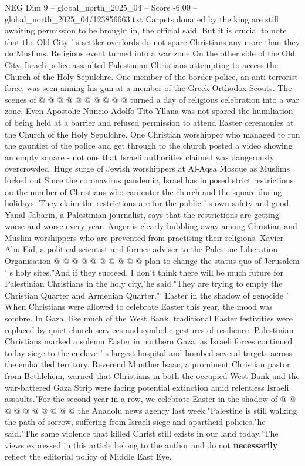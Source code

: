 \begin{textsample}{NEG Dim 9 – global\_north\_2025\_04 – Score -6.00 – global\_north\_2025\_04/123856663.txt}
Carpets donated by the king are still awaiting permission to be brought in, the official said.
But it is crucial to note that the Old City ' s settler overlords do not spare Christians any more than they do Muslims.
Religious event turned into a war zone On the other side of the Old City, Israeli police assaulted Palestinian Christians attempting to access the Church of the Holy Sepulchre.
One member of the border police, an anti-terrorist force, was seen aiming his gun at a member of the Greek Orthodox Scouts.
The scenes of @ @ @ @ @ @ @ @ @ @ turned a day of religious celebration into a war zone.
Even Apostolic Nuncio Adolfo Tito Yllana was not spared the humiliation of being held at a barrier and refused permission to attend Easter ceremonies at the Church of the Holy Sepulchre.
One Christian worshipper who managed to run the gauntlet of the police and get through to the church posted a video showing an empty square - not one that Israeli authorities claimed was dangerously overcrowded.
Huge surge of Jewish worshippers at Al-Aqsa Mosque as Muslims locked out Since the coronavirus pandemic, Israel has imposed strict restrictions on the number of Christians who can enter the church and the square during holidays.
They claim the restrictions are for the public ' s own safety and good.
Yanal Jabarin, a Palestinian journalist, says that the restrictions are getting worse and worse every year.
Anger is clearly bubbling away among Christian and Muslim worshippers who are prevented from practising their religions.
Xavier Abu Eid, a political scientist and former adviser to the Palestine Liberation Organisation @ @ @ @ @ @ @ @ @ @ plan to change the status quo of Jerusalem ' s holy sites."And if they succeed, I don't think there will be much future for Palestinian Christians in the holy city,"he said."They are trying to empty the Christian Quarter and Armenian Quarter."' Easter in the shadow of genocide ' When Christians were allowed to celebrate Easter this year, the mood was sombre.
In Gaza, like much of the West Bank, traditional Easter festivities were replaced by quiet church services and symbolic gestures of resilience.
Palestinian Christians marked a solemn Easter in northern Gaza, as Israeli forces continued to lay siege to the enclave ' s largest hospital and bombed several targets across the embattled territory.
Reverend Munther Isaac, a prominent Christian pastor from Bethlehem, warned that Christians in both the occupied West Bank and the war-battered Gaza Strip were facing potential extinction amid relentless Israeli assaults."For the second year in a row, we celebrate Easter in the shadow of @ @ @ @ @ @ @ @ @ @ the Anadolu news agency last week."Palestine is still walking the path of sorrow, suffering from Israeli siege and apartheid policies,"he said."The same violence that killed Christ still exists in our land today."The views expressed in this article belong to the author and do not \textbf{necessarily} reflect the editorial policy of Middle East Eye.

\end{textsample}

